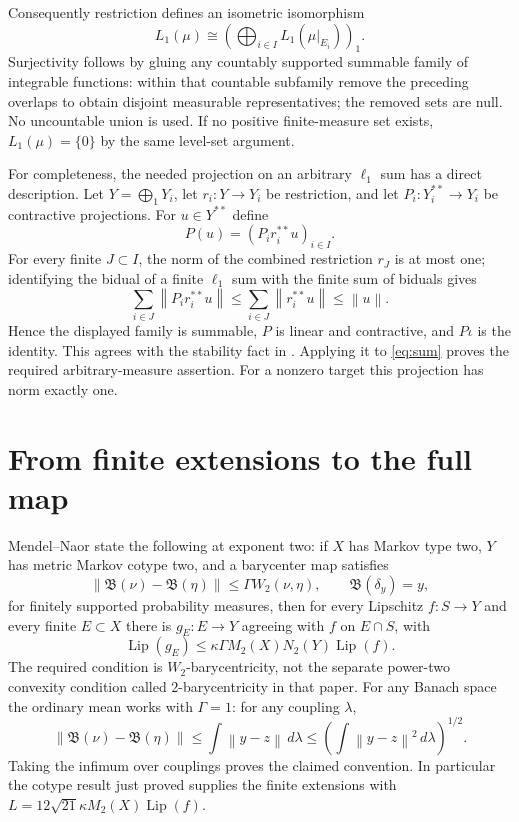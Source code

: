 \documentclass[11pt]{article}
\newcommand{\Lip}{\operatorname{Lip}}
\newcommand{\norm}[1]{\left\lVert#1\right\rVert}
\newcommand{\1}{\mathbf1}
\begin{document}
Consequently restriction defines an isometric isomorphism
\begin{equation}\label{eq:sum}
 L_1(\mu)\cong\left(\bigoplus_{i\in I}L_1(\mu|_{E_i})\right)_1.
\end{equation}
Surjectivity follows by gluing any countably supported summable family of integrable functions: within that countable subfamily remove the preceding overlaps to obtain disjoint measurable representatives; the removed sets are null. No uncountable union is used. If no positive finite-measure set exists, $L_1(\mu)=\{0\}$ by the same level-set argument.

For completeness, the needed projection on an arbitrary $\ell_1$ sum has a direct description. Let $Y=\bigoplus_1Y_i$, let $r_i:Y\to Y_i$ be restriction, and let $P_i:Y_i^{**}\to Y_i$ be contractive projections. For $u\in Y^{**}$ define
\[P(u)=(P_i r_i^{**}u)_{i\in I}.\]
For every finite $J\subset I$, the norm of the combined restriction $r_J$ is at most one; identifying the bidual of a finite $\ell_1$ sum with the finite sum of biduals gives
\[\sum_{i\in J}\norm{P_i r_i^{**}u}\leq\sum_{i\in J}\norm{r_i^{**}u}\leq\norm u.\]
Hence the displayed family is summable, $P$ is linear and contractive, and $P\iota$ is the identity. This agrees with the stability fact in \cite[Chapter IV, Proposition 1.5(b)]{HWW}. Applying it to \eqref{eq:sum} proves the required arbitrary-measure assertion. For a nonzero target this projection has norm exactly one.

\section{From finite extensions to the full map}
Mendel--Naor \cite[Theorem 1.11]{MN13} state the following at exponent two: if $X$ has Markov type two, $Y$ has metric Markov cotype two, and a barycenter map satisfies
\[\norm{\mathfrak B(\nu)-\mathfrak B(\eta)}\leq\Gamma W_2(\nu,\eta),\qquad\mathfrak B(\delta_y)=y,\]
for finitely supported probability measures, then for every Lipschitz $f:S\to Y$ and every finite $E\subset X$ there is $g_E:E\to Y$ agreeing with $f$ on $E\cap S$, with
\[\Lip(g_E)\leq\kappa\Gamma M_2(X)N_2(Y)\Lip(f).\]
The required condition is $W_2$-barycentricity, not the separate power-two convexity condition called $2$-barycentricity in that paper. For any Banach space the ordinary mean works with $\Gamma=1$: for any coupling $\lambda$,
\[
 \norm{\mathfrak B(\nu)-\mathfrak B(\eta)}
 \leq\int\norm{y-z}\,d\lambda
 \leq\left(\int\norm{y-z}^2\,d\lambda\right)^{1/2}.
\]
Taking the infimum over couplings proves the claimed convention. In particular the cotype result just proved supplies the finite extensions with $L=12\sqrt{21}\kappa M_2(X)\Lip(f)$.
\end{document}
